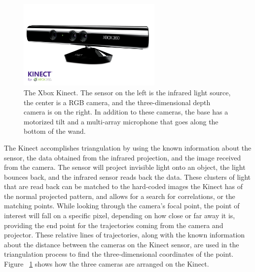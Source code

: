 \documentclass[pdftex,10.5pt]{report}
\begin{document}
\begin{figure}[H]
	\centering
	\includegraphics[width=70mm]{figures/kinect.jpg}
	\caption{The Xbox Kinect. The sensor on the left is the infrared light source, the center is a RGB camera, and the three-dimensional 				depth camera is on the right. In addition to these cameras, the base has a motorized tilt and a multi-array 				microphone that goes along the bottom of the wand.}
	\label{kinectlable}
\end{figure}

The Kinect accomplishes triangulation by using the known information about the sensor, the data obtained from the infrared projection, and the image received from the camera. The sensor will project invisible light onto an object, the light bounces back, and the infrared sensor reads back the data. These clusters of light that are read back can be matched to the hard-coded images the Kinect has of the normal projected pattern, and allows for a search for correlations, or the matching points. While looking through the camera's focal point, the point of interest will fall on a specific pixel, depending on how close or far away it is, providing the end point for the trajectories coming from the camera and projector. These relative lines of trajectories, along with the known information about the distance between the cameras on the Kinect sensor, are used in the triangulation process to find the three-dimensional coordinates of the point. Figure ~\ref{kinectlable} shows how the three cameras are arranged on the Kinect.
\end{document}
